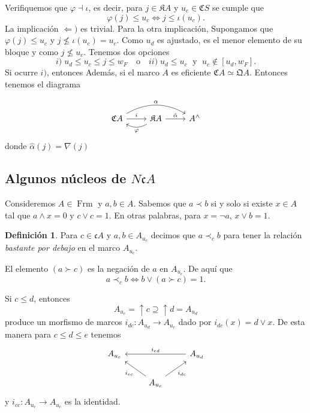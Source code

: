 \documentclass[11pt]{amsart}
\DeclareMathOperator{\Frm}{Frm}
\theoremstyle{plain}
\theoremstyle{definition}
\newtheorem{dfn}[thm]{Definición}
\begin{document}
Verifiquemos que $\varphi\dashv \iota$, es decir, para $j\in \mathfrak{K}A$ y $u_c\in \mathfrak{C}S$ se cumple que 
\[
\varphi(j)\leq u_c\Leftrightarrow j\leq \iota(u_c).
\]
La implicación $\Leftarrow)$ es trivial. Para la otra implicación, Supongamos que $\varphi(j)\leq u_c$ y $j\nleq \iota(u_c)=u_c$. Como $u_d$ es ajustado, es el menor elemento de su bloque y como $j\nleq u_c$. Tenemos dos opciones
\[
i)\;  u_d\leq u_c\leq j\leq w_F \quad \mbox{o}\quad ii)\;u_d\leq u_c\; \mbox{ y }\;u_c\notin [u_d, w_F].
\]
Si ocurre $i)$, entonces 
Además, si el marco $A$ es eficiente $\mathfrak{C}A\simeq \mathfrak{Q}A$. Entonces tenemos el diagrama 

\[
\begin{tikzcd}
\mathfrak{C}A \arrow[r, "i"] \arrow[rr, "\alpha", bend left] & \mathfrak{K}A \arrow[r, "\hat{\alpha}"] \arrow[l, "\varphi", bend left] & A^\wedge
\end{tikzcd}
\]
donde $\hat{\alpha}(j)=\nabla(j)$


\subsection{Algunos núcleos de $N\mathfrak{c}A$} 

Consideremos $A\in \Frm$ y $a, b\in A$. Sabemos que $a\prec b$ si y solo si existe $x\in A$ tal que $a\wedge x=0$ y $c\vee c=1$. En otras palabras, para $x=\neg a$, $x\vee b=1$.

\begin{dfn}\label{Bb en CA}
    Para $c\in \mathfrak{c}A$ y $a,b\in A_{u_c}$ decimos que $a\prec_c b$ para tener la relación \emph{bastante por debajo} en el marco $A_{u_c}$.
\end{dfn}

El elemento $(a\succ c)$ es la negación de $a$ en $A_{u_c}$. De aquí que
\[
a\prec_cb\Leftrightarrow b\vee (a\succ c)=1.
\]

Si $c\leq d$, entonces 
\[
A_{u_c}=\uparrow c\supseteq \uparrow d=A_{u_d}
\]
produce un morfismo de marcos $i_{dc}\colon A_{u_d}\to A_{u_c}$ dado por $i_{dc}(x)=d\vee x$. De esta manera para $c\leq d\leq e$ tenemos
\[\begin{tikzcd}
	{A_{u_e}} && {A_{u_d}} \\
	& {A_{u_c}}
	\arrow["{i_{ed}}"', from=1-3, to=1-1]
	\arrow["{i_{ec}}", from=2-2, to=1-1]
	\arrow["{i_{dc}}"', from=2-2, to=1-3]
\end{tikzcd}\]
y $i_{cc}\colon A_{u_c}\to A_{u_c}$ es la identidad.\\
\end{document}
